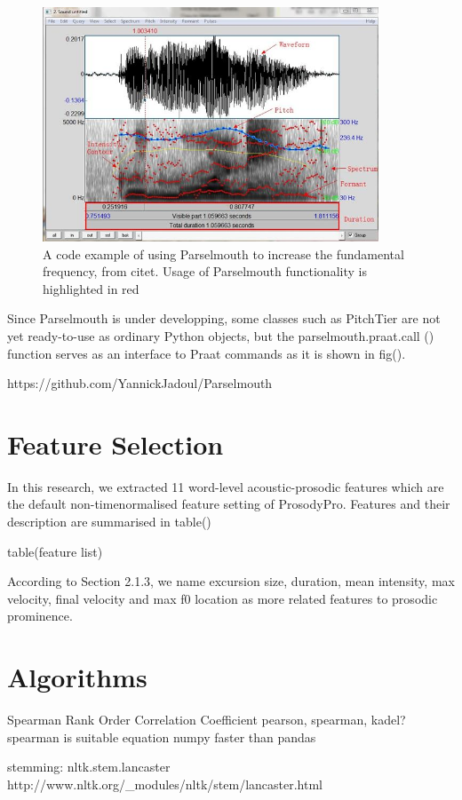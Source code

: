 \begin{figure}[ht]
	\center
	\includegraphics[width=10cm, scale=0.7]{figures/Praat.jpg}
	\caption{A code example of using Parselmouth to increase the fundamental frequency, from citet. Usage of Parselmouth functionality is highlighted in red}
	\label{fig:Parselmouth}
\end{figure}

Since Parselmouth is under developping, some classes such as PitchTier are not yet ready-to-use as ordinary Python objects, but the parselmouth.praat.call () function serves as an interface to Praat commands as it is shown in fig().

https://github.com/YannickJadoul/Parselmouth

\section{Feature Selection}
In this research, we extracted 11 word-level acoustic-prosodic features which are the default non-timenormalised feature setting of ProsodyPro. Features and their description are summarised in table()

table(feature list)

According to Section 2.1.3, we name excursion size, duration, mean intensity, max velocity, final velocity and max f0 location as more related features to prosodic prominence.

\section{Algorithms}
Spearman Rank Order Correlation Coefficient
pearson, spearman, kadel?
spearman is suitable
equation
numpy faster than pandas

stemming: nltk.stem.lancaster
http://www.nltk.org/_modules/nltk/stem/lancaster.html

